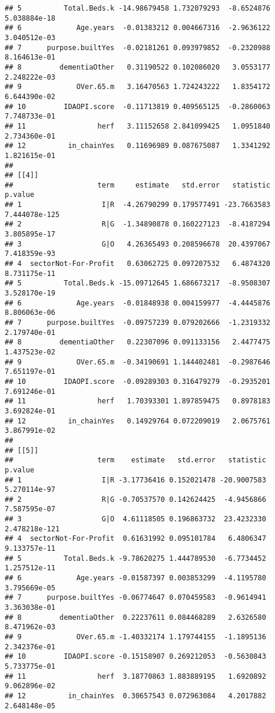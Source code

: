 \documentclass[]{article}
\begin{document}
\begin{verbatim}
## 5          Total.Beds.k -14.98679458 1.732079293  -8.6524876  5.038884e-18
## 6             Age.years  -0.01383212 0.004667316  -2.9636122  3.040512e-03
## 7      purpose.builtYes  -0.02181261 0.093979852  -0.2320988  8.164613e-01
## 8         dementiaOther   0.31190522 0.102086020   3.0553177  2.248222e-03
## 9             OVer.65.m   3.16470563 1.724243222   1.8354172  6.644390e-02
## 10         IDAOPI.score  -0.11713819 0.409565125  -0.2860063  7.748733e-01
## 11                 herf   3.11152658 2.841099425   1.0951840  2.734360e-01
## 12          in_chainYes   0.11696989 0.087675087   1.3341292  1.821615e-01
## 
## [[4]]
##                    term     estimate   std.error   statistic       p.value
## 1                   I|R  -4.26790299 0.179577491 -23.7663583 7.444078e-125
## 2                   R|G  -1.34890878 0.160227123  -8.4187294  3.805895e-17
## 3                   G|O   4.26365493 0.208596678  20.4397067  7.418359e-93
## 4  sectorNot-For-Profit   0.63062725 0.097207532   6.4874320  8.731175e-11
## 5          Total.Beds.k -15.09712645 1.686673217  -8.9508307  3.528170e-19
## 6             Age.years  -0.01848938 0.004159977  -4.4445876  8.806063e-06
## 7      purpose.builtYes  -0.09757239 0.079202666  -1.2319332  2.179740e-01
## 8         dementiaOther   0.22307096 0.091133156   2.4477475  1.437523e-02
## 9             OVer.65.m  -0.34190691 1.144402481  -0.2987646  7.651197e-01
## 10         IDAOPI.score  -0.09289303 0.316479279  -0.2935201  7.691246e-01
## 11                 herf   1.70393301 1.897859475   0.8978183  3.692824e-01
## 12          in_chainYes   0.14929764 0.072209019   2.0675761  3.867991e-02
## 
## [[5]]
##                    term    estimate   std.error   statistic       p.value
## 1                   I|R -3.17736416 0.152021478 -20.9007583  5.270114e-97
## 2                   R|G -0.70537570 0.142624425  -4.9456866  7.587595e-07
## 3                   G|O  4.61118505 0.196863732  23.4232330 2.478218e-121
## 4  sectorNot-For-Profit  0.61631992 0.095101784   6.4806347  9.133757e-11
## 5          Total.Beds.k -9.78620275 1.444789530  -6.7734452  1.257512e-11
## 6             Age.years -0.01587397 0.003853299  -4.1195780  3.795669e-05
## 7      purpose.builtYes -0.06774647 0.070459583  -0.9614941  3.363038e-01
## 8         dementiaOther  0.22237611 0.084468289   2.6326580  8.471962e-03
## 9             OVer.65.m -1.40332174 1.179744155  -1.1895136  2.342376e-01
## 10         IDAOPI.score -0.15158907 0.269212053  -0.5630843  5.733775e-01
## 11                 herf  3.18770863 1.883889195   1.6920892  9.062896e-02
## 12          in_chainYes  0.30657543 0.072963084   4.2017882  2.648148e-05
\end{verbatim}
\end{document}
